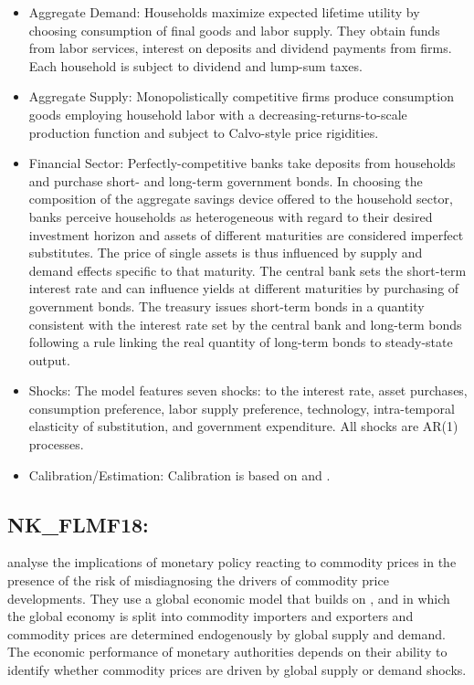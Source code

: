 \documentclass[11pt,a4paper]{article}
\begin{document}
	\begin{itemize}
		\item Aggregate Demand: Households maximize expected lifetime utility by choosing consumption of final goods and labor supply. They obtain funds from labor services, interest on deposits and dividend payments from firms. Each household is subject to dividend and lump-sum taxes.
		\item Aggregate Supply: Monopolistically competitive firms produce consumption goods employing household labor with a decreasing-returns-to-scale production function and subject to Calvo-style price rigidities.
		\item Financial Sector: Perfectly-competitive banks take deposits from households and purchase short- and long-term government bonds. In choosing the composition of the aggregate savings device offered to the household sector, banks perceive households as heterogeneous with regard to their desired investment horizon and assets of different maturities are considered imperfect substitutes. The price of single assets is thus influenced by supply and demand effects specific to that maturity. The central bank sets the short-term interest rate and can influence yields at different maturities by purchasing of government bonds. The treasury issues short-term bonds in a quantity consistent with the interest rate set by the central bank and long-term bonds following a rule linking the real quantity of long-term bonds to steady-state output.
		\item Shocks: The model features seven shocks: to the interest rate, asset purchases, consumption preference, labor supply preference, technology, intra-temporal elasticity of substitution, and government expenditure. All shocks are AR(1) processes.
		\item Calibration/Estimation: Calibration is based on \cite{gali2008monetary} and \cite{SmetsWouters2003,SmetsWouters2007}.
	\end{itemize}
	
	
	\subsection{NK\_FLMF18: \texorpdfstring{\cite{filardo2018monetary}}{Filardo et al. (2018)}}
	\label{NKFLMF18}
	\cite{filardo2018monetary} analyse the implications of monetary policy reacting to commodity prices in the presence of the risk of misdiagnosing the drivers of commodity price developments. They use a global economic model that builds on \cite{nakov2010monetary}, and in which the global economy is split into commodity importers and exporters and commodity prices are determined endogenously by global supply and demand. The economic performance of monetary authorities depends on their ability to identify whether commodity prices are driven by global supply or demand shocks.
	
\end{document}
